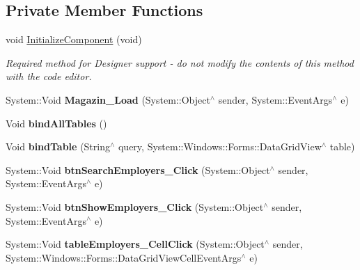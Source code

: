 \subsection*{Private Member Functions}
\begin{DoxyCompactItemize}
\item 
void \hyperlink{class_magazyn_1_1_magazin_a99d47c14fc619cce7d7b5a9ca5c2ebe3}{Initialize\+Component} (void)
\begin{DoxyCompactList}\small\item\em Required method for Designer support -\/ do not modify the contents of this method with the code editor. \end{DoxyCompactList}\item 
\hypertarget{class_magazyn_1_1_magazin_a2ad7fe1375419739a695465f414638d8}{}\label{class_magazyn_1_1_magazin_a2ad7fe1375419739a695465f414638d8} 
System\+::\+Void {\bfseries Magazin\+\_\+\+Load} (System\+::\+Object$^\wedge$ sender, System\+::\+Event\+Args$^\wedge$ e)
\item 
\hypertarget{class_magazyn_1_1_magazin_a37a58617166481649855eb4867db0b86}{}\label{class_magazyn_1_1_magazin_a37a58617166481649855eb4867db0b86} 
Void {\bfseries bind\+All\+Tables} ()
\item 
\hypertarget{class_magazyn_1_1_magazin_ac836f9c7837b13f5adbc01a73f5f161c}{}\label{class_magazyn_1_1_magazin_ac836f9c7837b13f5adbc01a73f5f161c} 
Void {\bfseries bind\+Table} (String$^\wedge$ query, System\+::\+Windows\+::\+Forms\+::\+Data\+Grid\+View$^\wedge$ table)
\item 
\hypertarget{class_magazyn_1_1_magazin_a0d0ba5c93832afc9cd1ecb6b0e14bc06}{}\label{class_magazyn_1_1_magazin_a0d0ba5c93832afc9cd1ecb6b0e14bc06} 
System\+::\+Void {\bfseries btn\+Search\+Employers\+\_\+\+Click} (System\+::\+Object$^\wedge$ sender, System\+::\+Event\+Args$^\wedge$ e)
\item 
\hypertarget{class_magazyn_1_1_magazin_ae1902458a4bf62efc0b39051f76605fa}{}\label{class_magazyn_1_1_magazin_ae1902458a4bf62efc0b39051f76605fa} 
System\+::\+Void {\bfseries btn\+Show\+Employers\+\_\+\+Click} (System\+::\+Object$^\wedge$ sender, System\+::\+Event\+Args$^\wedge$ e)
\item 
\hypertarget{class_magazyn_1_1_magazin_a440db111753f8946a6f1a1cbb289a8d5}{}\label{class_magazyn_1_1_magazin_a440db111753f8946a6f1a1cbb289a8d5} 
System\+::\+Void {\bfseries table\+Employers\+\_\+\+Cell\+Click} (System\+::\+Object$^\wedge$ sender, System\+::\+Windows\+::\+Forms\+::\+Data\+Grid\+View\+Cell\+Event\+Args$^\wedge$ e)
\item 

\end{DoxyCompactItemize}
